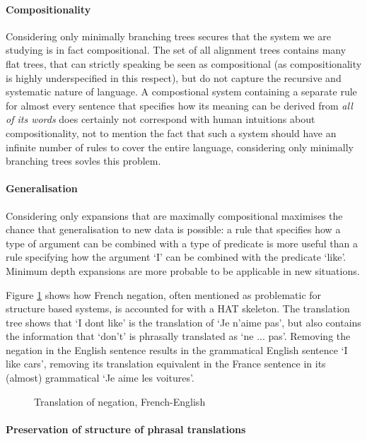 \documentclass{report}
\begin{document}
\paragraph{Compositionality} Considering only minimally branching trees secures that the system we are studying is in fact compositional. The set of all alignment trees contains many flat trees, that can strictly speaking be seen as compositional (as compositionality is highly underspecified in this respect), but do not capture the recursive and systematic nature of language. A compostional system containing a separate rule for almost every sentence that specifies how its meaning can be derived from \textit{all of its words} does certainly not correspond with human intuitions about compositionality, not to mention the fact that such a system should have an infinite number of rules to cover the entire language, considering only minimally branching trees sovles this problem.

\paragraph{Generalisation} Considering only expansions that are maximally compositional maximises the chance that generalisation to new data is possible: a rule that specifies how a type of argument can be combined with a type of predicate is more useful than a rule specifying how the argument `I' can be combined with the predicate `like'. Minimum depth expansions are more probable to be applicable in new situations. 

Figure \ref{fig:nepas} shows how French negation, often mentioned as problematic for structure based systems, is accounted for with a HAT skeleton. The translation tree shows that `I dont like' is the translation of `Je n'aime pas', but also contains the information that `don't' is phrasally translated as `ne ... pas'. Removing the negation in the English sentence results in the grammatical English sentence `I like cars', removing its translation equivalent in the France sentence in its (almost) grammatical `Je aime les voitures'. 

\begin{figure}[!ht]
\centering

\caption{Translation of negation, French-English}\label{fig:nepas}
\end{figure} 

\paragraph{Preservation of structure of phrasal translations}
\end{document}
